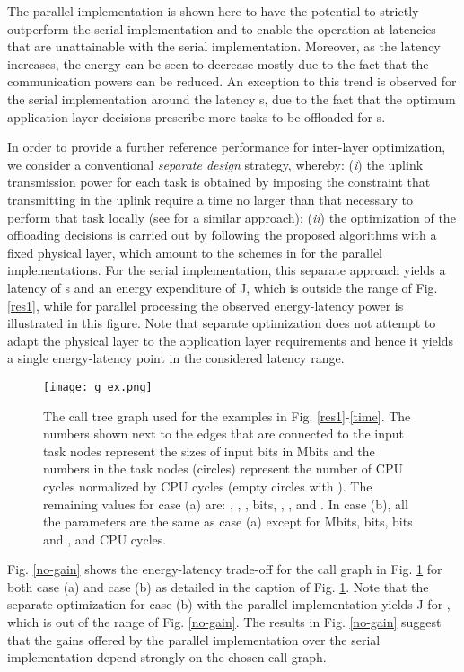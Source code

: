 \documentclass[journal,twocolumn,10pt,twoside]{IEEEtranTCOM}
\theoremstyle{plain}
\theoremstyle{plain}
\theoremstyle{remark}
\begin{document}
The parallel implementation is shown here to have the potential to strictly outperform the serial implementation and to enable the operation at latencies that are unattainable with the serial implementation. Moreover, as the latency increases, the energy can be seen to decrease mostly due to the fact that the communication powers can be reduced. An exception to this trend is observed for the serial implementation around the latency  s, due to the fact that the optimum application layer decisions prescribe more tasks to be offloaded for  s.

In order to provide a further reference performance for inter-layer optimization, we consider a conventional \textit{separate design} strategy, whereby: (\textit{i}) the uplink transmission power for each task is obtained by imposing the constraint that transmitting in the uplink require a time no larger than that necessary to perform that task locally (see \cite[Sec. 3]{bar} for a similar approach); (\textit{ii}) the optimization of the offloading decisions is carried out by following the proposed algorithms with a fixed physical layer, which amount to the schemes in \cite{no}\cite{hermp} for the parallel implementations. For the serial implementation, this separate approach yields a latency of  s and an energy expenditure of  J, which is outside the range of Fig. \ref{res1}, while for parallel processing the observed energy-latency power is illustrated in this figure. Note that separate optimization does not attempt to adapt the physical layer to the application layer requirements and hence it yields a single energy-latency point in the considered latency range.
\begin{figure}
\centering
\texttt{[image: g\_ex.png]}
\caption{The call tree graph used for the examples in Fig. \ref{res1}-\ref{time}. The numbers shown next to the edges that are connected to the input task nodes represent the sizes of input bits  in Mbits and the numbers in the task nodes (circles) represent the number of CPU cycles  normalized by  CPU cycles (empty circles with ). The remaining values for case (a) are: , , ,  bits,  , ,  and . In case (b), all the parameters are the same as case (a) except for  Mbits,  bits,  bits and ,  and  CPU cycles.}\label{g_ex}
\vspace{-1.5em}
\end{figure}

Fig. \ref{no-gain} shows the energy-latency trade-off for the call graph in Fig. \ref{g_ex} for both case (a) and case (b) as detailed in the caption of Fig. \ref{g_ex}. Note that the separate optimization for case (b) with the parallel implementation yields  J for , which is out of the range of Fig. \ref{no-gain}. The results in Fig. \ref{no-gain} suggest that the gains offered by the parallel implementation over the serial implementation depend strongly on the chosen call graph.
\end{document}
